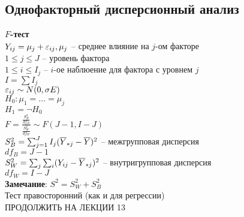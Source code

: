 \documentclass[12pt]{article}
\begin{document}
\subsection{Однофакторный дисперсионный анализ}
\textbf{$F$-тест}\\
$Y_{ij} = \mu_{j} + \varepsilon_{ij}, \mu_j$ -- среднее влияние на $j$-ом факторе\\
$1 \leq j \leq J$ -- уровень фактора\\
$1 \leq i \leq I_j$ -- $i$-ое наблюение для фактора с уровнем $j$\\
$I = \sum I_j$\\
$\varepsilon_{ij} \sim N(0, \sigma E)$\\
$H_0: \mu_1 = \ldots = \mu_j$\\
$H_1 = \lnot H_0$\\
$F = \frac{\frac{S^2_B}{df_B}}{\frac{S^2_W}{df_W}} \sim F(J - 1, I - J)$\\
$S^2_B = \sum_{j=1}^J I_j (\overline Y_{*j} - \overline Y)^2$ -- межгрупповая дисперсия\\
$df_B = J - 1$\\
$S^2_W = \sum_j \sum_i (Y_{ij} - \overline Y_{*j})^2$ -- внутригрупповая дисперсия\\
$df_W = I - J$\\
\textbf{Замечание}: $S^2 = S^2_W + S^2_B$\\
Тест правосторонний (как и для регрессии)\\
ПРОДОЛЖИТЬ НА ЛЕКЦИИ 13
\end{document}
